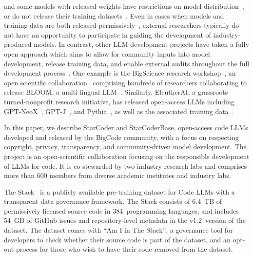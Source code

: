 and some models with released weights have restrictions on model distribution~\citep{touvron2023llama}, or do not release their training datasets~\citep{nijkamp:codegen,zhang2022opt,fried2022incoder}. Even in cases when models and training data are both released permissively~\citep{raffel2020exploring,tay2022unifying}, external researchers typically do not have an opportunity to participate in guiding the development of industry-produced models. In contrast, other LLM development projects have taken a fully open approach which aims to allow for community inputs into model development, release training data, and enable external audits throughout the full development process~\citep{solaiman2023gradient}. One example is the BigScience research workshop~\citep{bigscience_workshop_2022}, an open scientific collaboration~\citep{akiki-bigscience-22} comprising hundreds of researchers collaborating to release BLOOM, a multi-lingual LLM~\citep{scao2022bloom,muennighoff2022crosslingual}. Similarly, EleutherAI, a grassroots-turned-nonprofit research initiative, has released open-access LLMs including GPT-NeoX~\citep{black2022gpt}, GPT-J~\citep{wang2021gpt}, and Pythia~\citep{biderman2023pythia}, as well as the associated training data~\citep{gao2020pile}. 

In this paper, we describe StarCoder and StarCoderBase, open-access code LLMs developed and released by the BigCode community, with a focus on respecting copyright, privacy, transparency, and community-driven model development. The project is an open-scientific collaboration focusing on the responsible development of LLMs for code. It is co-stewarded by two industry research labs and comprises more than 600 members from diverse academic institutes and industry labs. 

The Stack~\citep{Kocetkov2022TheStack} is a publicly available pre-training dataset for Code LLMs with a transparent data governance framework. The Stack consists of 6.4~TB of permissively licensed source code in 384~programming languages, and includes 54~GB of GitHub issues and repository-level metadata in the v1.2~version of the dataset. The dataset comes with ``Am I in The Stack'', a governance tool for developers to check whether their source code is part of the dataset, and an opt-out process for those who wish to have their code removed from the dataset. 

